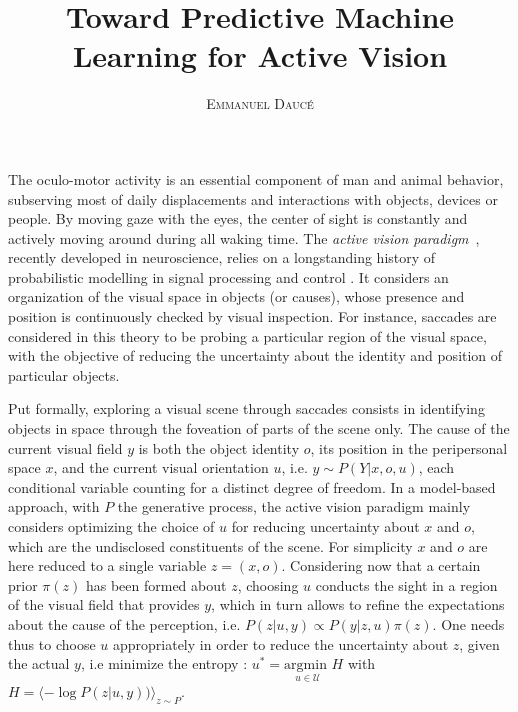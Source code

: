 \documentclass[12pt,twoside,openright]{article}
\title{\textbf{Toward Predictive Machine Learning for Active Vision} }
\author{\textsc{Emmanuel Daucé}}%
\date{}
\begin{document}
	
\maketitle
	
	The oculo-motor activity is an essential component of man and animal behavior, subserving most of daily displacements and interactions with objects, devices or people. By moving gaze with the eyes, the center of sight is constantly and actively moving around during all waking time.  %
	The {\it active vision paradigm}~\cite{friston2012perceptions}, recently developed in neuroscience, relies on a longstanding history of probabilistic modelling in signal processing and control \cite{Kalman1960,Baum1966,friston1994statistical}. 
	It considers an organization of the visual space in objects (or causes), whose presence and position is continuously checked by visual inspection. For instance, saccades are considered in this theory to be probing a particular region of the visual space, with the objective of reducing the uncertainty about the identity and position of particular objects. %
	
	Put formally, exploring a visual scene through saccades consists in identifying objects in space through the foveation of parts of the scene only. The cause of the current visual field $y$ is both the object identity $o$, its position in the peripersonal space $x$, and the current visual orientation $u$, i.e. $y \sim P(Y|x,o,u)$, each conditional variable counting for a distinct degree of freedom. %
	In a model-based approach, with $P$ the generative process, the active vision paradigm mainly considers optimizing the choice of $u$ for reducing uncertainty about $x$ and $o$, which are the undisclosed constituents of the scene. For simplicity $x$ and $o$ are here reduced to a single variable $z = (x, o)$. Considering now that a certain prior $\pi(z)$ has been formed about $z$, choosing  $u$ conducts the sight in a region of the visual field that provides $y$, which in turn allows to refine the expectations about the cause of the perception, i.e.
	$ P(z|u,y) \propto P(y|z,u) \pi(z)$. 
	One needs thus to choose $u$ appropriately in order to reduce the uncertainty about $z$, given the actual $y$, i.e minimize the entropy :
	$u^* = \underset{u \in \mathcal{U}}{\text{argmin }} H$ with $H = \langle -\log P(z|u,y))\rangle_{z\sim P}$.
	
\end{document}
